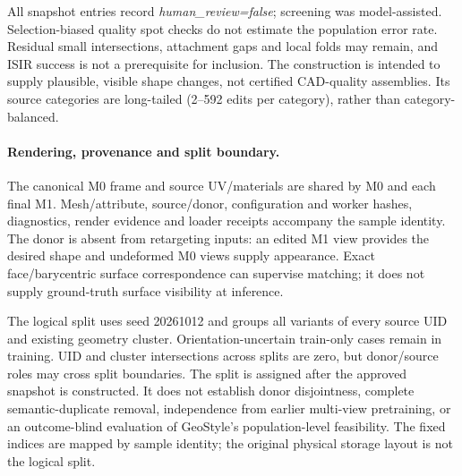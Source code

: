 All snapshot entries record \emph{human\_review=false}; screening was
model-assisted. Selection-biased quality spot checks do not estimate the
population error rate. Residual small intersections, attachment gaps and
local folds may remain, and ISIR success is not a prerequisite for inclusion.
The construction is intended to supply plausible, visible shape changes,
not certified CAD-quality assemblies. Its source categories are long-tailed
(2--592 edits per category), rather than category-balanced.

\paragraph{Rendering, provenance and split boundary.}
The canonical M0 frame and source UV/materials are shared by M0 and each
final M1. Mesh/attribute, source/donor, configuration and worker hashes,
diagnostics, render evidence and loader receipts accompany the sample
identity. The donor is absent from retargeting inputs: an edited M1 view
provides the desired shape and undeformed M0 views supply appearance.
Exact face/barycentric surface correspondence can supervise matching;
it does not supply ground-truth surface visibility at inference.

The logical split uses seed 20261012 and groups all variants of every source
UID and existing geometry cluster. Orientation-uncertain train-only cases
remain in training. UID and cluster intersections across splits are zero,
but donor/source roles may cross split boundaries. The split is assigned
after the approved snapshot is constructed. It does not establish donor
disjointness, complete semantic-duplicate removal, independence from earlier
multi-view pretraining, or an outcome-blind evaluation of GeoStyle's
population-level feasibility. The fixed indices are mapped by sample
identity; the original physical storage layout is not the logical split.
